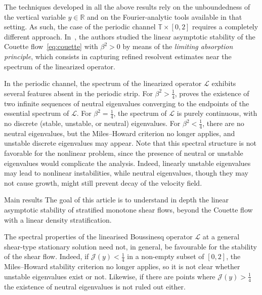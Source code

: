 \documentclass[11pt,reqno]{amsproc}
\makeatletter
\renewcommand\subsection{\@startsection{subsection}{2}%
\normalparindent{.5\linespacing\@plus.7\linespacing}{-.5em}
{\normalfont\bfseries}}
\theoremstyle{definition}
\numberwithin{equation}{section}
\renewcommand{\L}{{\mathcal{L}}}
\newcommand{\cJ}{{\mathcal{J}}}
\newcommand{\R}{{\mathbb R}}
\newcommand{\T}{{\mathbb T}}
\makeatother
\begin{document}
The techniques developed in all the above results rely on the unboundedness of the vertical variable $y \in \R$ and on the  Fourier-analytic tools available in that setting. As such, the case of the periodic channel \( \T \times [0,2] \) requires a completely different approach. In~\cite{CZN25chan}, the authors studied the linear asymptotic stability of the Couette flow~\eqref{eq:couette} with $\beta^{2} > 0$ by means of the \emph{limiting absorption principle}, which consists in capturing refined resolvent estimates near the spectrum of the linearized operator. 

In the periodic channel, the spectrum of the linearized operator \( \L \) exhibits several features absent in the periodic strip. For $\beta^{2} > \tfrac{1}{4}$, \cite{CZN25chan} proves the existence of two infinite sequences of neutral eigenvalues converging to the endpoints of the essential spectrum of \( \L \). For $\beta^{2} = \tfrac{1}{4}$, the spectrum of \( \L \) is purely continuous, with no discrete (stable, unstable, or neutral) eigenvalues. For $\beta^{2} < \tfrac{1}{4}$, there are no neutral eigenvalues, but the Miles--Howard criterion no longer applies, and unstable discrete eigenvalues may appear. Note that this spectral structure is not favorable for the nonlinear problem, since the presence of neutral or unstable eigenvalues would complicate the analysis. Indeed, linearly unstable eigenvalues may lead to nonlinear instabilities, while neutral eigenvalues, though they may not cause growth, might still prevent decay of the velocity field.



\subsection{Main results}
The goal of this article is to understand in depth the linear asymptotic stability of stratified monotone shear flows, beyond the Couette flow with a linear density stratification. 

The spectral properties of the linearised Boussinesq operator $\L$ at a general shear-type stationary solution need not, in general, be favourable for the stability of the shear flow. Indeed, if $\cJ(y)< \frac14$ in a non-empty subset of $[0,2]$,  the Miles--Howard stability criterion no longer applies, so it is not clear whether unstable eigenvalues exist or not. Likewise, if there are points where $\cJ(y) > \frac14$ the existence of neutral eigenvalues is not ruled out either.
\end{document}
